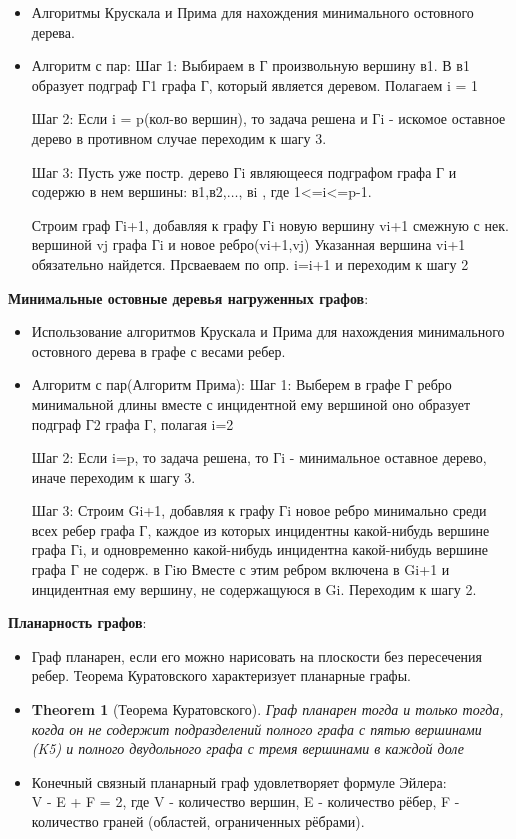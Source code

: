\documentclass[
]{article}
\providecommand{\tightlist}{%
  \setlength{\itemsep}{0pt}\setlength{\parskip}{0pt}}
\newtheorem{theorem}{Theorem}
\begin{document}
\begin{enumerate}
{{{{{  \begin{itemize}
  \tightlist
  \item
    Алгоритмы Крускала и Прима для нахождения минимального остовного
    дерева.
  \item Алгоритм с пар:
    Шаг 1: Выбираем в Г произвольную вершину в1. В в1 образует подграф Г1 графа Г, который является деревом. Полагаем i = 1 

    Шаг 2: Если i = p(кол-во вершин), то задача решена и Гi - искомое оставное дерево в противном случае переходим к шагу 3. 

    Шаг 3: Пусть уже постр. дерево Гi являющееся подграфом графа Г и содержю в нем вершины: в1,в2,$\dots$, вi , где 1<=i<=p-1. 

    Строим граф Гi+1, добавляя к графу Гi новую вершину vi+1 смежную с нек. вершиной vj графа Гi и новое ребро(vi+1,vj) 
    Указанная вершина vi+1 обязательно найдется. Прсваеваем по опр. i=i+1 и переходим к шагу 2
  \end{itemize}
\item
  \textbf{Минимальные остовные деревья нагруженных графов}:

  \begin{itemize}
  \tightlist
  \item
    Использование алгоритмов Крускала и Прима для нахождения
    минимального остовного дерева в графе с весами ребер.
  \item Алгоритм с пар(Алгоритм Прима):
    Шаг 1: Выберем в графе Г ребро минимальной длины вместе с инцидентной ему вершиной оно образует подграф Г2 графа Г, полагая i=2

    Шаг 2: Если i=p, то задача решена, то Гi - минимальное оставное дерево, иначе переходим к шагу 3. 

    Шаг 3: Строим Gi+1, добавляя к графу Гi новое ребро минимально среди всех ребер графа Г, каждое из которых инцидентны какой-нибудь вершине
    графа Гi, и одновременно какой-нибудь инцидентна какой-нибудь вершине графа Г не содерж. в Гiю 
    Вместе с этим ребром включена в Gi+1 и инцидентная ему вершину, не содержащуюся в Gi. Переходим к шагу 2. 
  \end{itemize}
\item
  \textbf{Планарность графов}:

  \begin{itemize}
  \tightlist
  \item
    Граф планарен, если его можно нарисовать на плоскости без
    пересечения ребер. Теорема Куратовского характеризует планарные
    графы.
  \item 
    \begin{theorem}[Теорема Куратовского]
      Граф планарен тогда и только тогда, когда он не содержит подразделений полного графа с пятью вершинами (K5) и полного двудольного графа с тремя вершинами в каждой доле 
    \end{theorem}
  \item
Конечный связный планарный граф удовлетворяет формуле Эйлера:\\ 
    V - E + F = 2,
где V - количество вершин, E - количество рёбер, F - количество граней (областей, ограниченных рёбрами).


\end{itemize}}}}}}
\end{enumerate}
\end{document}
